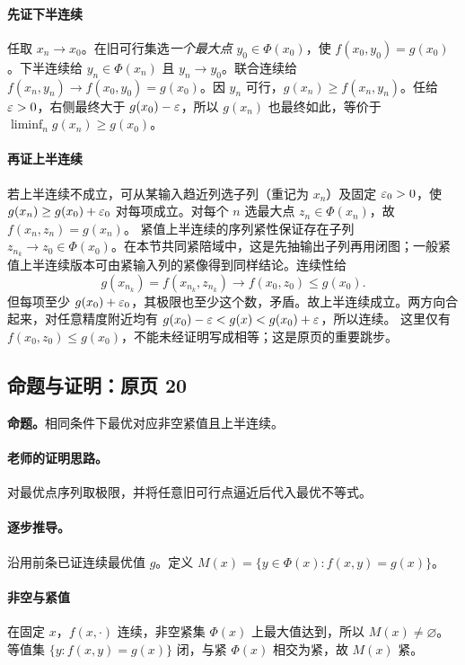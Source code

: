 \paragraph{先证下半连续}
任取 $x_n\to x_0$。在旧可行集选\emph{一个最大点} $y_0\in\Phi(x_0)$，使 $f(x_0,y_0)=g(x_0)$。下半连续给 $y_n\in\Phi(x_n)$ 且 $y_n\to y_0$。联合连续给 $f(x_n,y_n)\to f(x_0,y_0)=g(x_0)$。因 $y_n$ 可行，$g(x_n)\ge f(x_n,y_n)$。任给 $\varepsilon>0$，右侧最终大于 $g(x_0)-\varepsilon$，所以 $g(x_n)$ 也最终如此，等价于 $\liminf_n g(x_n)\ge g(x_0)$。
\paragraph{再证上半连续}
若上半连续不成立，可从某输入趋近列选子列（重记为 $x_n$）及固定 $\varepsilon_0>0$，使 $g(x_n)\ge g(x_0)+\varepsilon_0$ 对每项成立。对每个 $n$ 选最大点 $z_n\in\Phi(x_n)$，故 $f(x_n,z_n)=g(x_n)$。
紧值上半连续的序列紧性保证存在子列 $z_{n_k}\to z_0\in\Phi(x_0)$。在本节共同紧陪域中，这是先抽输出子列再用闭图；一般紧值上半连续版本可由紧输入列的紧像得到同样结论。连续性给
\[g(x_{n_k})=f(x_{n_k},z_{n_k})\longrightarrow f(x_0,z_0)\le g(x_0).\]
但每项至少 $g(x_0)+\varepsilon_0$，其极限也至少这个数，矛盾。故上半连续成立。两方向合起来，对任意精度附近均有 $g(x_0)-\varepsilon<g(x)<g(x_0)+\varepsilon$，所以连续。
这里仅有 $f(x_0,z_0)\le g(x_0)$，不能未经证明写成相等；这是原页的重要跳步。


\subsection{命题与证明：原页 20}

\textbf{命题。}相同条件下最优对应非空紧值且上半连续。

\paragraph{老师的证明思路。}对最优点序列取极限，并将任意旧可行点逼近后代入最优不等式。

\paragraph{逐步推导。}
沿用前条已证连续最优值 $g$。定义 $M(x)=\{y\in\Phi(x):f(x,y)=g(x)\}$。
\paragraph{非空与紧值}在固定 $x$，$f(x,\cdot)$ 连续，非空紧集 $\Phi(x)$ 上最大值达到，所以 $M(x)\ne\varnothing$。等值集 $\{y:f(x,y)=g(x)\}$ 闭，与紧 $\Phi(x)$ 相交为紧，故 $M(x)$ 紧。
